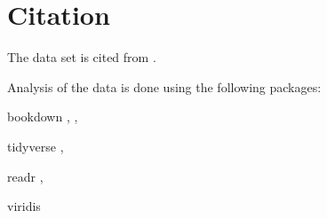 \documentclass[11pt,a4paper,]{article}
\begin{document}
\section*{Citation}

The data set is cited from \textcite{owidmeatproduction}.

Analysis of the data is done using the following packages:

bookdown \textcite{bookdown1}, \textcite{bookdown2},

tidyverse \textcite{tidyverse},

readr \textcite{readr},

viridis \textcite{viridis}

\printbibliography
\end{document}
